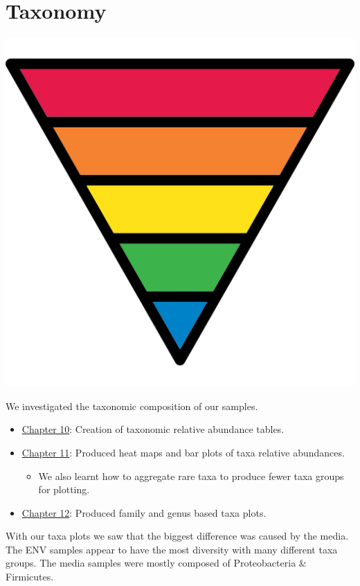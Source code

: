 \documentclass[
]{book}
\providecommand{\tightlist}{%
  \setlength{\itemsep}{0pt}\setlength{\parskip}{0pt}}
\begin{document}
\hypertarget{taxonomy}{%
\section{Taxonomy}\label{taxonomy}}

\includegraphics{figures/taxa.png}

We investigated the taxonomic composition of our samples.

\begin{itemize}
\tightlist
\item
  \protect\hyperlink{taxa_relabund_chap}{Chapter 10}: Creation of taxonomic relative abundance tables.
\item
  \protect\hyperlink{chaptaxaplots}{Chapter 11}: Produced heat maps and bar plots of taxa relative abundances.

  \begin{itemize}
  \tightlist
  \item
    We also learnt how to aggregate rare taxa to produce fewer taxa groups for plotting.
  \end{itemize}
\item
  \protect\hyperlink{family_genus_chap}{Chapter 12}: Produced family and genus based taxa plots.
\end{itemize}

With our taxa plots we saw that the biggest difference was caused by the media.
The ENV samples appear to have the most diversity with many different taxa groups.
The media samples were mostly composed of Proteobacteria \& Firmicutes.
\end{document}
